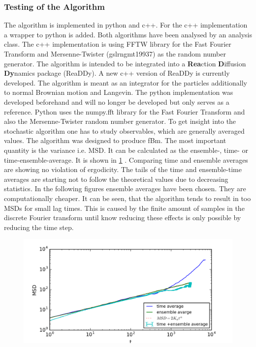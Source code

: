 \documentclass[
  a4paper,BCOR10mm,oneside,
  bibtotoc,idxtotoc,
  headsepline,footsepline,%
  fleqn,openbib
]{scrbook}
\begin{document}
\subsubsection{Testing of the Algorithm}
The algorithm is implemented in python and c++. For the c++ implementation a wrapper to python is added. Both algorithms have been analysed by an analysis class. The c++ implementation is using FFTW library for the Fast Fourier Transform and Mersenne-Twister (gsl\texttt{\textunderscore}rng\texttt{\textunderscore}mt19937) as the random number generator. The algorithm is intended to be integrated into a \textbf{Rea}ction \textbf{D}iffusion \textbf{Dy}namics package (ReaDDy). A new c++ version of ReaDDy is currently developed. The algorithm is meant as an integrator for the particles additionally to normal Brownian motion and Langevin. The python implementation was developed beforehand and will no longer be developed but only serves as a reference. Python uses the numpy.fft library for the Fast Fourier Transform and also the Mersenne-Twister random number generator.\newline
To get insight into the stochastic algorithm one has to study observables, which are generally averaged values. The algorithm was designed to produce fBm. The most important quantity is the variance i.e. MSD. It can be calculated as the ensemble-, time- or time-ensemble-average. It is shown in \cref{fig:4} . Comparing time and ensemble averages are showing no violation of ergodicity. The tails of the time and ensemble-time averages are starting not to follow the theoretical values due to decreasing statistics. In the following figures ensemble averages have been chosen. They are computationally cheaper. It can be  seen, that the algorithm tends to result in  too MSDs for small lag times. This is caused by the finite amount of samples in the discrete Fourier transform until know reducing these effects is only possible by reducing the time step.
\begin{figure}[h!]
  \centering
  \includegraphics[width=\textwidth]{./data/averages_comparison.png}
  \captionsetup{width=\linewidth}
  \label{fig:4}
\end{figure}
\end{document}
